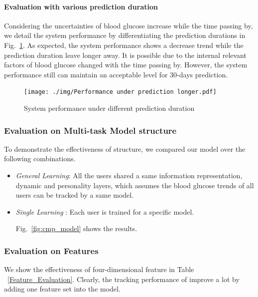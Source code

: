 \paragraph{Evaluation with various prediction duration}

Considering the uncertainties of blood glucose increase while the time passing by, we detail the system performance by differentiating the prediction durations in  Fig.~\ref{fig:per_under_various_pred_days}.
As expected, the system performance shows a decrease trend while the prediction duration leave longer away. It is possible due to the internal relevant factors of blood glucose changed with the time passing by. However, the system performance still can maintain an acceptable level for 30-days prediction.



\begin{figure}[!t]
\centering
\texttt{[image: ./img/Performance under prediction
longer.pdf]}
\caption{System performance under different prediction duration}
\label{fig:per_under_various_pred_days}
\end{figure}



\subsubsection{Evaluation on Multi-task Model structure}
To demonstrate the effectiveness of \modelname structure, we compared our model over the following combinations.

\begin{itemize}

  \item \emph{General Learning}:
  All the users shared a same information representation, dynamic and personality layers, which assumes the blood glucose trends of all users can be tracked by a same model.


  \item \emph{Single Learning }:
  Each user is trained for a specific model.

  Fig.~\ref{fig:cmp_model} shows the results.
\end{itemize}

\subsubsection{Evaluation on Features}

We show the effectiveness of four-dimensional feature in Table ~\ref{Feature_Evaluation}. Clearly, the tracking performance of \sysname improve a lot by adding one feature set into the model.




